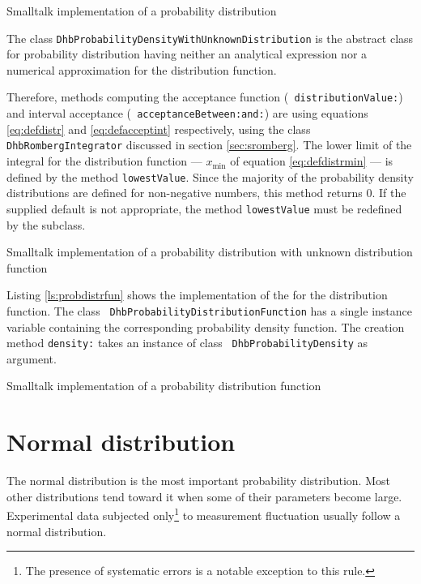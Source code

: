 \begin{listing} Smalltalk implementation of a probability distribution
\label{ls:probdistr}

\end{listing}

The class {\tt DhbProbabilityDensityWithUnknownDistribution} is
the abstract class for probability distribution having neither an
analytical expression nor a numerical approximation for the
distribution function.

Therefore, methods computing the acceptance function ({\tt
distributionValue:}) and interval acceptance ({\tt
acceptanceBetween:and:}) are using equations \ref{eq:defdistr} and
\ref{eq:defacceptint} respectively, using the class {\tt
DhbRombergIntegrator} discussed in section \ref{sec:sromberg}. The
lower limit of the integral for the distribution function ---
$x_{\min}$ of equation \ref{eq:defdistrmin} --- is defined by the
method {\tt lowestValue}. Since the majority of the probability
density distributions are defined for non-negative numbers, this
method returns 0. If the supplied default is not appropriate, the
method {\tt lowestValue} must be redefined by the subclass.

\begin{listing} Smalltalk implementation of a probability distribution with unknown
distribution function\label{ls:probunkdistr}

\end{listing}

Listing \ref{ls:probdistrfun} shows the implementation of the
 for the distribution function. The class {\tt
DhbProbabilityDistributionFunction} has a single instance variable
containing the corresponding probability density function. The
creation method {\tt density:} takes an instance of class {\tt
DhbProbabilityDensity} as argument.

\begin{listing} Smalltalk implementation of a probability distribution function
\label{ls:probdistrfun}

\end{listing}


\section{Normal distribution}
\label{sec:normdist} The normal distribution is the most important
probability distribution. Most other distributions tend toward it
when some of their parameters become large. Experimental data
subjected only\footnote{The presence of systematic errors is a
notable exception to this rule.} to measurement fluctuation
usually follow a normal distribution.

